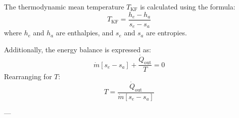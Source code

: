 The thermodynamic mean temperature \( T_{\text{KF}} \) is calculated using the formula:  
\[
T_{\text{KF}} = \frac{h_e - h_a}{s_e - s_a}
\]  
where \( h_e \) and \( h_a \) are enthalpies, and \( s_e \) and \( s_a \) are entropies.  

Additionally, the energy balance is expressed as:  
\[
\dot{m} \left[ s_e - s_a \right] + \frac{\dot{Q}_{\text{out}}}{T} = 0
\]  
Rearranging for \( T \):  
\[
T = \frac{\dot{Q}_{\text{out}}}{\dot{m} \left[ s_e - s_a \right]}
\]  

---